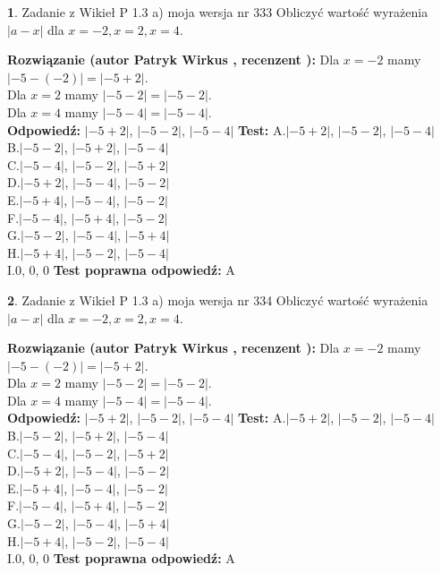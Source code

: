 \documentclass[12pt, a4paper]{article}
\theoremstyle{definition} %
\newtheorem{zad}{}
\newcommand{\zadStart}[1]{\begin{zad}#1\newline}
\newcommand{\zadStop}{\end{zad}}
\newcommand{\rozwStart}[2]{\noindent \textbf{Rozwiązanie (autor #1 , recenzent #2): }\newline}
\newcommand{\rozwStop}{\newline}
\newcommand{\odpStart}{\noindent \textbf{Odpowiedź:}\newline}
\newcommand{\odpStop}{\newline}
\newcommand{\testStart}{\noindent \textbf{Test:}\newline}
\newcommand{\testStop}{\newline}
\newcommand{\kluczStart}{\noindent \textbf{Test poprawna odpowiedź:}\newline}
\newcommand{\kluczStop}{\newline}
\begin{document}
\zadStart{Zadanie z Wikieł P 1.3 a) moja wersja nr 333}
Obliczyć wartość wyrażenia $|a - x|$ dla $x=-2,x=2,x=4$.
\zadStop
\rozwStart{Patryk Wirkus}{}
Dla $x = -2$ mamy $|-5 - (-2)| = |-5 + 2|$.\\
Dla $x = 2$ mamy $|-5 - 2| = |-5 - 2|$.\\
Dla $x = 4$ mamy $|-5 - 4| = |-5 - 4|$.\\
\rozwStop
\odpStart
$|-5 + 2|$, $|-5 - 2|$, $|-5 - 4|$
\odpStop
\testStart
A.$|-5 + 2|$, $|-5 - 2|$, $|-5 - 4|$\\
B.$|-5 - 2|$, $|-5 + 2|$, $|-5 - 4|$\\
C.$|-5 - 4|$, $|-5 - 2|$, $|-5 + 2|$\\
D.$|-5 + 2|$, $|-5 - 4|$, $|-5 - 2|$\\
E.$|-5 + 4|$, $|-5 - 4|$, $|-5 - 2|$\\
F.$|-5 - 4|$, $|-5 + 4|$, $|-5 - 2|$\\
G.$|-5 - 2|$, $|-5 - 4|$, $|-5 + 4|$\\
H.$|-5 + 4|$, $|-5 - 2|$, $|-5 - 4|$\\
I.$0$, $0$, $0$
\testStop
\kluczStart
A
\kluczStop



\zadStart{Zadanie z Wikieł P 1.3 a) moja wersja nr 334}
Obliczyć wartość wyrażenia $|a - x|$ dla $x=-2,x=2,x=4$.
\zadStop
\rozwStart{Patryk Wirkus}{}
Dla $x = -2$ mamy $|-5 - (-2)| = |-5 + 2|$.\\
Dla $x = 2$ mamy $|-5 - 2| = |-5 - 2|$.\\
Dla $x = 4$ mamy $|-5 - 4| = |-5 - 4|$.\\
\rozwStop
\odpStart
$|-5 + 2|$, $|-5 - 2|$, $|-5 - 4|$
\odpStop
\testStart
A.$|-5 + 2|$, $|-5 - 2|$, $|-5 - 4|$\\
B.$|-5 - 2|$, $|-5 + 2|$, $|-5 - 4|$\\
C.$|-5 - 4|$, $|-5 - 2|$, $|-5 + 2|$\\
D.$|-5 + 2|$, $|-5 - 4|$, $|-5 - 2|$\\
E.$|-5 + 4|$, $|-5 - 4|$, $|-5 - 2|$\\
F.$|-5 - 4|$, $|-5 + 4|$, $|-5 - 2|$\\
G.$|-5 - 2|$, $|-5 - 4|$, $|-5 + 4|$\\
H.$|-5 + 4|$, $|-5 - 2|$, $|-5 - 4|$\\
I.$0$, $0$, $0$
\testStop
\kluczStart
A
\kluczStop
\end{document}
